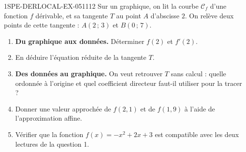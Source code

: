 \begin{exercice}{1SPE-DERLOCAL-EX-051}{1}{12}
Sur un graphique, on lit la courbe $\mathcal{C}_f$ d'une fonction $f$
dérivable, et sa tangente $T$ au point $A$ d'abscisse $2$. On relève deux
points de cette tangente : $A(2\,;\,3)$ et $B(0\,;\,7)$.
\begin{enumerate}
\item \textbf{Du graphique aux données.} Déterminer $f(2)$ et $f'(2)$.
\item En déduire l'équation réduite de la tangente $T$.
\item \textbf{Des données au graphique.} On veut retrouver $T$ sans calcul :
  quelle ordonnée à l'origine et quel coefficient directeur faut-il utiliser
  pour la tracer ?
\item Donner une valeur approchée de $f(2{,}1)$ et de $f(1{,}9)$ à l'aide de
  l'approximation affine.
\item Vérifier que la fonction $f(x) = -x^2 + 2x + 3$ est compatible avec les
  deux lectures de la question 1.
\end{enumerate}
\end{exercice}
